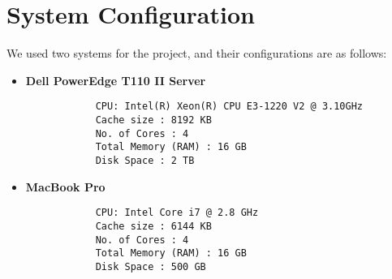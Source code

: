 \section{System Configuration}

We used two systems for the project, and their configurations are as follows:
\begin{itemize}
	\item \textbf{Dell PowerEdge T110 II Server}
		\begin{verbatim}
			CPU: Intel(R) Xeon(R) CPU E3-1220 V2 @ 3.10GHz
			Cache size : 8192 KB
			No. of Cores : 4
			Total Memory (RAM) : 16 GB
			Disk Space : 2 TB	
		\end{verbatim}
	\item \textbf{MacBook Pro}
			\begin{verbatim}
			CPU: Intel Core i7 @ 2.8 GHz
			Cache size : 6144 KB
			No. of Cores : 4
			Total Memory (RAM) : 16 GB
			Disk Space : 500 GB	
			\end{verbatim}
\end{itemize}
